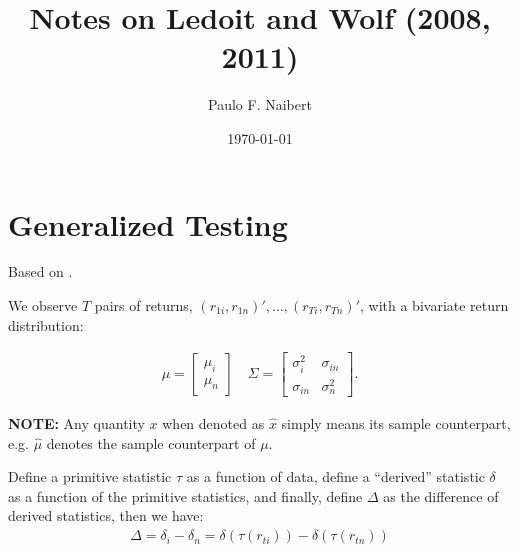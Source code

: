 \documentclass[12pt,oneside,a4paper]{article}
\begin{document}
\title{Notes on Ledoit and Wolf (2008, 2011)}
\author{Paulo F. Naibert}
\date{\today}

\maketitle

\thispagestyle{headings}
\section{Generalized Testing}
Based on \cite{lw2008-sr, lw2011-var}.

We observe $T$ pairs of returns, $(r_{1i}, r_{1n})', \dots, (r_{Ti}, r_{Tn})'$, with a bivariate return distribution:
% 

\begin{align*}
\mu=
\begin{bmatrix}
\mu_{i} \\ \mu_{n}
\end{bmatrix}
\quad
\Sigma=
\begin{bmatrix}
\sigma_{i}^2 & \sigma_{in}
\\
\sigma_{in} & \sigma_{n}^2
\end{bmatrix}.
\end{align*}

\textbf{NOTE:} Any quantity $x$ when denoted as $\hat{x}$ simply means its sample counterpart, e.g. $\hat{\mu}$ denotes the sample counterpart of $\mu$.

Define a primitive statistic $\tau$ as a function of data, define a ``derived'' statistic $\delta$ as a function of the primitive statistics, and finally, define $\Delta$ as the difference of derived statistics, then we have:
\begin{align*}
	\Delta = \delta_{i} - \delta_{n} = \delta(\tau(r_{ti})) - \delta(\tau(r_{tn}))
\end{align*}
\end{document}
